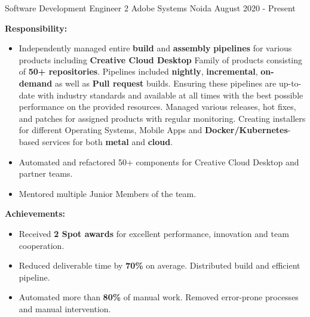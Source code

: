 

\begin{cventries}
\vspace{-1mm}

\cventry
    {Software Development Engineer 2} %
    {Adobe Systems} %
    {Noida} %
    {August 2020 - Present} %
    {
        \vspace{-4mm}
        \item \textbf{Responsibility:} 
        \begin{itemize}
            \item Independently managed entire \textbf{build} and \textbf{assembly} \textbf{pipelines} for various products including \textbf{Creative Cloud Desktop} Family of products consisting of \textbf{50+ repositories}. Pipelines included \textbf{nightly}, \textbf{incremental}, \textbf{on-demand} as well as \textbf{Pull request} builds. Ensuring these pipelines are up-to-date with industry standards and available at all times with the best possible performance on the provided resources. Managed various releases, hot fixes, and patches for assigned products with regular monitoring. Creating installers for different Operating Systems, Mobile Apps and \textbf{Docker/Kubernetes}-based services for both \textbf{metal} and \textbf{cloud}.
            \item Automated and refactored 50+ components for Creative Cloud Desktop and partner teams.
            \item Mentored multiple Junior Members of the team.
        \end{itemize}
        \item \textbf{Achievements:}
        \begin{itemize}
            \item Received \textbf{2 Spot awards} for excellent performance, innovation and team cooperation.
            \item Reduced deliverable time by \textbf{70\%} on average. Distributed build and efficient pipeline.
            \item Automated more than \textbf{80\%} of manual work. Removed error-prone processes and manual intervention.

\end{itemize}}
\end{cventries}
